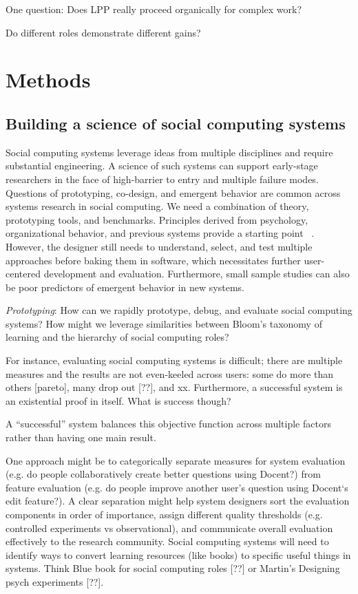 One question: Does LPP really proceed organically for complex work?

Do different roles demonstrate different gains?

\section{Methods} 
\subsection{Building a science of social computing systems}
Social computing systems leverage ideas from multiple disciplines and require substantial engineering. A science of such systems can support early-stage researchers in the face of high-barrier to entry and multiple failure modes. Questions of prototyping, co-design, and emergent behavior are common across systems research in social computing. We need a combination of theory, prototyping tools, and benchmarks. Principles derived from psychology, organizational behavior, and previous systems provide a starting point ~\cite{fromstatement}. However, the designer still needs to understand, select, and test multiple approaches before baking them in software, which necessitates further user-centered development and evaluation. Furthermore, small sample studies can also be poor predictors of emergent behavior in new systems. 

\textit{Prototyping}: How can we rapidly prototype, debug, and evaluate social computing systems? How might we leverage similarities between Bloom’s taxonomy of learning and the hierarchy of social computing roles?

For instance, evaluating social computing systems is difficult; there are multiple measures and the results are not even-keeled across users: some do more than others [pareto], many drop out [??], and xx. Furthermore, a successful system is an existential proof in itself. What is success though?

A “successful” system balances this objective function across multiple factors rather than having one main result. 

One approach might be to categorically separate measures for system evaluation (e.g. do people collaboratively create better questions using Docent?) from feature evaluation (e.g. do people improve another user’s question using Docent‘s edit feature?). A clear separation might help system designers sort the evaluation components in order of importance, assign different quality thresholds (e.g. controlled experiments vs observational), and communicate overall evaluation effectively to the research community.
Social computing systems will need to identify ways to convert learning resources (like books) to specific useful things in systems. Think Blue book for social computing roles [??] or Martin’s Designing psych experiments [??]. 

